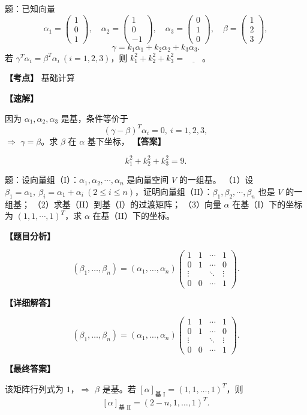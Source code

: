 ﻿\documentclass[11pt,a4paper,UTF8]{ctexart}
\begin{document}
\begin{answerbox}[2023--2024 填空 5]
题：已知向量
\[
\alpha_1=\begin{pmatrix}1\\0\\1\end{pmatrix},\quad
\alpha_2=\begin{pmatrix}1\\0\\-1\end{pmatrix},\quad
\alpha_3=\begin{pmatrix}0\\1\\0\end{pmatrix},\quad
\beta=\begin{pmatrix}1\\2\\3\end{pmatrix},
\]
\[
\gamma=k_1\alpha_1+k_2\alpha_2+k_3\alpha_3.
\]
若 $\gamma^T\alpha_i=\beta^T\alpha_i\ (i=1,2,3)$，则 $k_1^2+k_2^2+k_3^2=\underline{\qquad}$。

\textbf{【考点】} 基础计算

\textbf{【速解】}

因为 $\alpha_1,\alpha_2,\alpha_3$ 是基，条件等价于
\[(\gamma-\beta)^T\alpha_i=0,\ i=1,2,3,\]
$\Rightarrow$ $\gamma=\beta$。求 $\beta$ 在 $\alpha$ 基下坐标，
\textbf{【答案】}

\[k_1^2+k_2^2+k_3^2=9.\]
\end{answerbox}
\begin{answerbox}
题：设向量组（I）：$\alpha_1,\alpha_2,\cdots,\alpha_n$ 是向量空间 $V$ 的一组基。
（1）设 $\beta_1=\alpha_1,\ \beta_i=\alpha_1+\alpha_i\ (2\le i\le n)$，证明向量组（II）：$\beta_1,\beta_2,\cdots,\beta_n$ 也是 $V$ 的一组基；
（2）求基（II）到基（I）的过渡矩阵；
（3）向量 $\alpha$ 在基（I）下的坐标为 $(1,1,\cdots,1)^T$，求 $\alpha$ 在基（II）下的坐标。

\textbf{【题目分析】}

\[
(\beta_1,\ldots,\beta_n)=(\alpha_1,\ldots,\alpha_n)
\begin{pmatrix}
1&1&\cdots&1\\
0&1&\cdots&0\\
\vdots& &\ddots&\vdots\\
0&0&\cdots&1
\end{pmatrix}.
\]

\textbf{【详细解答】}

\[
(\beta_1,\ldots,\beta_n)=(\alpha_1,\ldots,\alpha_n)
\begin{pmatrix}
1&1&\cdots&1\\
0&1&\cdots&0\\
\vdots& &\ddots&\vdots\\
0&0&\cdots&1
\end{pmatrix}.
\]

\textbf{【最终答案】}

该矩阵行列式为 $1$，$\Rightarrow$ $\beta$ 是基。若 $[\alpha]_{\text{基 I}}=(1,1,\ldots,1)^T$，则
\[[\alpha]_{\text{基 II}}=(2-n,1,\ldots,1)^T.\]
\end{answerbox}
\end{document}
